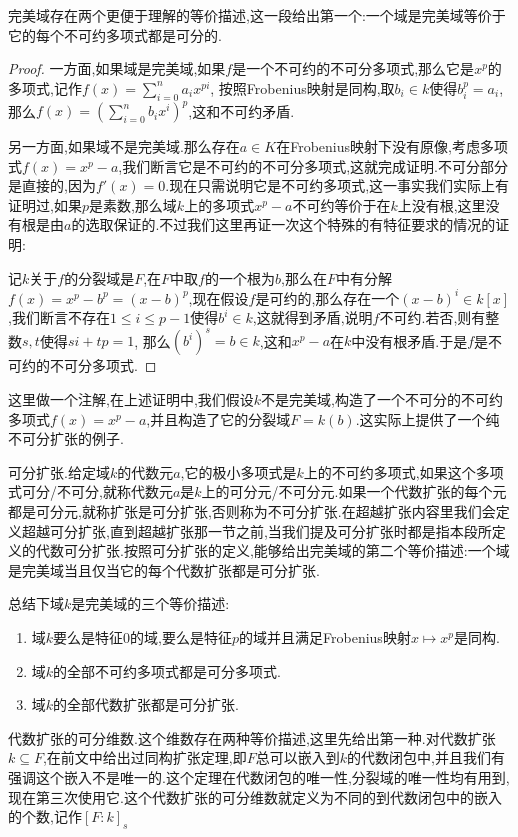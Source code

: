 完美域存在两个更便于理解的等价描述,这一段给出第一个:一个域是完美域等价于它的每个不可约多项式都是可分的.
\begin{proof}

一方面,如果域是完美域,如果$f$是一个不可约的不可分多项式,那么它是$x^p$的多项式,记作$f(x)=\sum_{i=0}^n a_ix^{pi}$, 按照Frobenius映射是同构,取$b_i\in k$使得$b_i^p=a_i$,那么$f(x)=\left(\sum_{i=0}^n b_ix^i\right)^p$,这和不可约矛盾.

另一方面,如果域不是完美域.那么存在$a\in K$在Frobenius映射下没有原像,考虑多项式$f(x)=x^p-a$,我们断言它是不可约的不可分多项式,这就完成证明.不可分部分是直接的,因为$f'(x)=0$.现在只需说明它是不可约多项式,这一事实我们实际上有证明过,如果$p$是素数,那么域$k$上的多项式$x^p-a$不可约等价于在$k$上没有根,这里没有根是由$a$的选取保证的.不过我们这里再证一次这个特殊的有特征要求的情况的证明:

记$k$关于$f$的分裂域是$F$,在$F$中取$f$的一个根为$b$,那么在$F$中有分解$f(x)=x^p-b^p=(x-b)^p$,现在假设$f$是可约的,那么存在一个$(x-b)^i\in k[x]$,我们断言不存在$1\le i\le p-1$使得$b^i\in k$,这就得到矛盾,说明$f$不可约.若否,则有整数$s,t$使得$si+tp=1$, 那么$(b^{i})^s=b\in k$,这和$x^p-a$在$k$中没有根矛盾.于是$f$是不可约的不可分多项式.
\end{proof}

这里做一个注解,在上述证明中,我们假设$k$不是完美域,构造了一个不可分的不可约多项式$f(x)=x^p-a$,并且构造了它的分裂域$F=k(b)$.这实际上提供了一个纯不可分扩张的例子.

可分扩张.给定域$k$的代数元$a$,它的极小多项式是$k$上的不可约多项式,如果这个多项式可分/不可分,就称代数元$a$是$k$上的可分元/不可分元.如果一个代数扩张的每个元都是可分元,就称扩张是可分扩张,否则称为不可分扩张.在超越扩张内容里我们会定义超越可分扩张,直到超越扩张那一节之前,当我们提及可分扩张时都是指本段所定义的代数可分扩张.按照可分扩张的定义,能够给出完美域的第二个等价描述:一个域是完美域当且仅当它的每个代数扩张都是可分扩张.

总结下域$k$是完美域的三个等价描述:
\begin{enumerate}
	\item 域$k$要么是特征0的域,要么是特征$p$的域并且满足Frobenius映射$x\mapsto x^p$是同构.
	\item 域$k$的全部不可约多项式都是可分多项式.
	\item 域$k$的全部代数扩张都是可分扩张.
\end{enumerate}

代数扩张的可分维数.这个维数存在两种等价描述,这里先给出第一种.对代数扩张$k\subseteq F$,在前文中给出过同构扩张定理,即$F$总可以嵌入到$k$的代数闭包中,并且我们有强调这个嵌入不是唯一的.这个定理在代数闭包的唯一性,分裂域的唯一性均有用到,现在第三次使用它.这个代数扩张的可分维数就定义为不同的到代数闭包中的嵌入的个数,记作$[F:k]_s$

